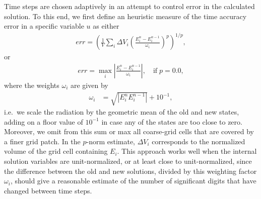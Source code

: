 \documentclass[letterpaper,10pt]{article}
\renewcommand{\(}{\left(}
\renewcommand{\)}{\right)}
\begin{document}
Time steps are chosen adaptively in an attempt to control error in the
calculated solution.  To this end, we first define an heuristic
measure of the time accuracy error in a specific variable $u$ as
either
\begin{align}
\label{eq:time_error}
  err = \left(\frac{1}{V} \sum_{i} \Delta V_i 
    \left(\frac{E_i^{n}-E_i^{n-1}}{\omega_i}\right)^p\right)^{1/p}, 
\end{align}
or
\begin{align}
\label{eq:time_error_inf}
  err = \max_i\left|\frac{E_i^{n}-E_i^{n-1}}{\omega_i}\right|,
  \quad\text{if}\; p=0.0,
\end{align}
where the weights $\omega_i$ are given by
\begin{align}
\label{eq:time_weighting}
  \omega_i &= \sqrt{\left|E_i^n E_i^{n-1}\right|} + 10^{-1},
\end{align}
i.e.~we scale the radiation by the geometric mean of the old and new
states, adding on a floor value of $10^{-1}$ in case any of the states
are too close to zero.  Moreover, we omit from this sum or max all
coarse-grid cells that are covered by a finer grid patch.  In the
$p$-norm estimate, $\Delta V_i$ corresponds to the normalized volume
of the grid cell containing $E_i$. This approach works well when the
internal solution variables are unit-normalized, or at least close to
unit-normalized, since the difference between the old and new
solutions, divided by this weighting factor $\omega_i$, should give a
reasonable estimate of the number of significant digits that have
changed between time steps. 
\end{document}
